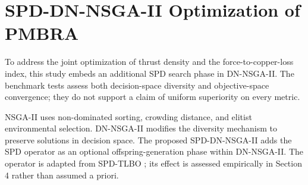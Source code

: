 \section{SPD-DN-NSGA-II Optimization of PMBRA}
To address the joint optimization of thrust density and the force-to-copper-loss index, this study embeds an additional SPD search phase in DN-NSGA-II. The benchmark tests assess both decision-space diversity and objective-space convergence; they do not support a claim of uniform superiority on every metric.
\par NSGA-II uses non-dominated sorting, crowding distance, and elitist environmental selection. DN-NSGA-II \cite{liang2016multimodal} modifies the diversity mechanism to preserve solutions in decision space. The proposed SPD-DN-NSGA-II adds the SPD operator as an optional offspring-generation phase within DN-NSGA-II. The operator is adapted from SPD-TLBO \cite{sun2025stochastic}; its effect is assessed empirically in Section 4 rather than assumed a priori.
